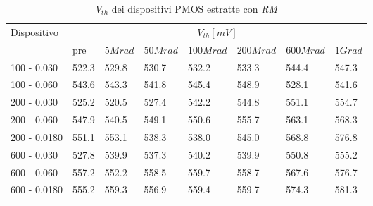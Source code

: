 \documentclass[
	a4paper,
	cleardoublepage=empty,
	headings=twolinechapter,
	numbers=autoenddot,
]{scrbook}
\begin{document}
\begin{table}[H]
  \renewcommand{\arraystretch}{1.3}
  \begin{tabular}{m{2.1cm} m{0.8cm} m{1.1cm} m{1.3cm} m{1.5cm} m{1.5cm} m{1.5cm} m{1cm}}
    \toprule
    \multirow{2}{*}{Dispositivo} & \multicolumn{7}{c}{$V_{th} [mV] $}                                                                    \\
    \cmidrule{2-8}
                                 & pre                                & $5Mrad$ & $50Mrad$ & $100Mrad$ & $200Mrad$ & $600Mrad$ & $1Grad$ \\
    \midrule
    100 - 0.030                     & 522.3                              & 529.8   & 530.7    & 532.2     & 533.3     & 544.4     & 547.3   \\
    \hline
    100 - 0.060                     & 543.6                              & 543.3   & 541.8    & 545.4     & 548.9     & 528.1     & 541.6   \\
    \hline
    200 - 0.030                     & 525.2                              & 520.5   & 527.4    & 542.2     & 544.8     & 551.1     & 554.7   \\
    \hline
    200 - 0.060                     & 547.9                              & 540.5   & 549.1    & 550.6     & 555.7     & 563.1     & 568.3   \\
    \hline
    200 - 0.0180                    & 551.1                              & 553.1   & 538.3    & 538.0     & 545.0     & 568.8     & 576.8   \\
    \hline
    600 - 0.030                     & 527.8                              & 539.9   & 537.3    & 540.2     & 539.9     & 550.8     & 555.2   \\
    \hline
    600 - 0.060                     & 557.2                              & 552.2   & 558.5    & 559.7     & 558.7     & 567.6     & 576.7   \\
    \hline
    600 - 0.0180                    & 555.2                              & 559.3   & 556.9    & 559.4     & 559.7     & 574.3     & 581.3   \\
    \bottomrule
  \end{tabular}
  \caption{$V_{th}$ dei dispositivi PMOS estratte con \emph{RM}}
  \label{tab:VthRMP}
\end{table}
\end{document}
